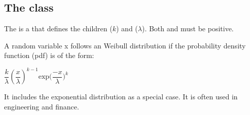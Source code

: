 \subsection{The  class}
\label{WeibullDistribution-class}
\label{weibulldistribution-class}

The \WeibullDistribution is a \ContinuousUnivariateDistribution that defines the \UncertValue children  ($k$) and  ($\lambda$).  Both  and  must be positive.

A random variable x follows an Weibull distribution if the probability density function (pdf) is of the form:

\begin{center}
$\dfrac{k}{\lambda}\left(\dfrac{x}{\lambda}\right)^{k-1}\mathrm{exp}\bigg(\dfrac{-x}{\lambda}\bigg)^k$
\end{center}

It includes the exponential distribution as a special case. It is often used in engineering and finance.

